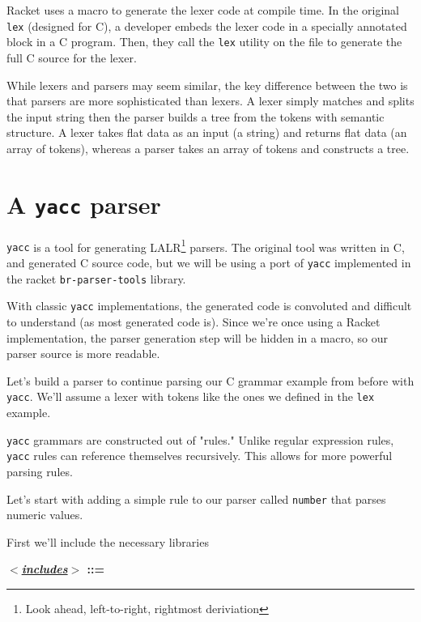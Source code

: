 \documentclass{book}
\newcommand{\Scribtexttt}[1]{{\texttt{#1}}}
\newcommand{\plainlink}[1]{#1}
\let\SOriginalthesubsubsection\thesubsubsection
\newcommand{\Ssubsection}[2]{\subsection[#1]{#2}\let\thesubsubsection\SOriginalthesubsubsection}
\newcommand{\NoteBox}[1]{\footnote{#1}}
\newcommand{\NoteContent}[1]{#1}
\renewcommand{\Ssubsection}[2]{\section[#1]{#2}}
\begin{document}
Racket uses a macro to generate the lexer code at compile time. In the
original \Scribtexttt{lex} (designed for C), a developer embeds the lexer code in
a specially annotated block in a C program. Then, they call the \Scribtexttt{lex}
utility on the file to generate the full C source for the lexer.

While lexers and parsers may seem similar, the key difference between the
two is that parsers are more sophisticated than lexers. A lexer simply
matches and splits the input string then the parser builds a tree from the
tokens with semantic structure. A lexer takes flat data as an input
(a string) and returns flat data (an array of tokens), whereas a parser
takes an array of tokens and constructs a tree.

\Ssubsection{A \Scribtexttt{yacc} parser}{A \Scribtexttt{yacc} parser}\label{t:x28part_x22Ax5fyaccx5fparserx22x29}

\Scribtexttt{yacc} is a tool for generating LALR\NoteBox{\NoteContent{Look ahead, left{-}to{-}right,
rightmost deriviation}} parsers.  The original tool was written in C,
and generated C source code, but we will be using a port of \Scribtexttt{yacc} implemented
in the racket \Scribtexttt{br{-}parser{-}tools} library.

With classic \Scribtexttt{yacc} implementations, the generated code
is convoluted and difficult to understand (as most generated code is).
Since we{'}re once using a Racket implementation, the parser generation step will be
hidden in a macro, so our parser source is more readable.

Let{'}s build a parser to continue parsing our C grammar example from before with
\Scribtexttt{yacc}. We{'}ll assume a lexer with tokens like the ones we defined in the \Scribtexttt{lex}
example.

\Scribtexttt{yacc} grammars are constructed out of "rules." Unlike regular expression
rules, \Scribtexttt{yacc} rules can reference themselves recursively. This
allows for more powerful parsing rules.

Let{'}s start with adding a simple rule to our parser called \Scribtexttt{number} that
parses numeric values.

First we{'}ll include the necessary libraries

\label{t:x28elem_x28chunk_x22x3cincludesx3ex3a1x22x29x29}\textbf{\textit{\hyperref[t:x28elem_x28chunk_x22x3cincludesx3ex3a1x22x29x29]{\plainlink{$<$includes$>$}}} ::=}
\end{document}

